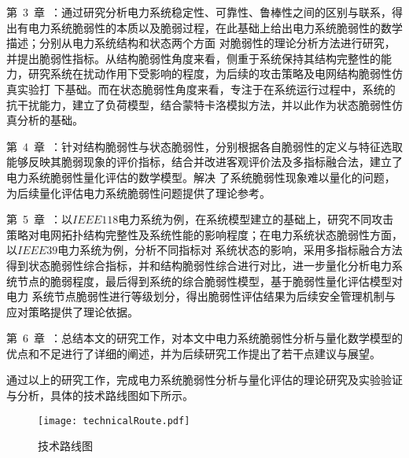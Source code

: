 第~3~章~：通过研究分析电力系统稳定性、可靠性、鲁棒性之间的区别与联系，得出有电力系统脆弱性的本质以及脆弱过程，在此基础上给出电力系统脆弱性的数学描述；分别从电力系统结构和状态两个方面
对脆弱性的理论分析方法进行研究，并提出脆弱性指标。从结构脆弱性角度来看，侧重于系统保持其结构完整性的能力，研究系统在扰动作用下受影响的程度，为后续的攻击策略及电网结构脆弱性仿真实验打
下基础。而在状态脆弱性角度来看，专注于在系统运行过程中，系统的抗干扰能力，建立了负荷模型，结合蒙特卡洛模拟方法，并以此作为状态脆弱性仿真分析的基础。

第~4~章~：针对结构脆弱性与状态脆弱性，分别根据各自脆弱性的定义与特征选取能够反映其脆弱现象的评价指标，结合并改进客观评价法及多指标融合法，建立了电力系统脆弱性量化评估的数学模型。解决
了系统脆弱性现象难以量化的问题，为后续量化评估电力系统脆弱性问题提供了理论参考。

第~5~章~：以$IEEE118$电力系统为例，在系统模型建立的基础上，研究不同攻击策略对电网拓扑结构完整性及系统性能的影响程度；在电力系统状态脆弱性方面，以$IEEE39$电力系统为例，分析不同指标对
系统状态的影响，采用多指标融合方法得到状态脆弱性综合指标，并和结构脆弱性综合进行对比，进一步量化分析电力系统节点的脆弱程度，最后得到系统的综合脆弱性模型，基于脆弱性量化评估模型对电力
系统节点脆弱性进行等级划分，得出脆弱性评估结果为后续安全管理机制与应对策略提供了理论依据。

第~6~章~：总结本文的研究工作，对本文中电力系统脆弱性分析与量化数学模型的优点和不足进行了详细的阐述，并为后续研究工作提出了若干点建议与展望。

通过以上的研究工作，完成电力系统脆弱性分析与量化评估的理论研究及实验验证与分析，具体的技术路线图如下所示。
\begin{figure}[H] %
  \centering
  \texttt{[image: technicalRoute.pdf]}
  \caption{技术路线图}
  \label{fig:technicalRoute}
\end{figure}
